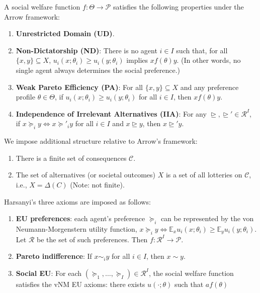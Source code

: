 \documentclass[11pt]{elegantbook_2}
\begin{document}
\begin{definition}
    A social welfare function $f: \Theta \rightarrow \mathcal{P}$ satisfies the following properties under the Arrow framework:
    \begin{enumerate}[$\circ$]
        \item \textbf{Unrestricted Domain (UD)}.
        \item \textbf{Non-Dictatorship (ND)}: There is no agent $i \in I$ such that, for all $\{x, y\} \subseteq X$, $u_i(x;\theta_i)\geq u_i(y;\theta_i)$ implies $x f(\theta) y$. (In other words, no single agent always determines the social preference.)
        \item \textbf{Weak Pareto Efficiency (PA)}: For all $\{x, y\} \subseteq X$ and any preference profile $\theta \in \Theta$, if $u_i(x;\theta_i)\geq u_i(y;\theta_i)$ for all $i \in I$, then $x f(\theta) y$.
        \item \textbf{Independence of Irrelevant Alternatives (IIA)}: For any $\trianglerighteq, \trianglerighteq' \in \mathcal{R}^I$, if $x \succcurlyeq_i y \Leftrightarrow x \succcurlyeq'_i y$ for all $i \in I$ and $x \trianglerighteq y$, then $x \trianglerighteq' y$.
    \end{enumerate}
\end{definition}
We impose additional structure relative to Arrow's framework:
\begin{enumerate}
    \item There is a finite set of consequences $\mathcal{C}$.
    \item The set of alternatives (or societal outcomes) $X$ is a set of all lotteries on $\mathcal{C}$, i.e., $X=\Delta(C)$ (Note: not finite).
\end{enumerate}

\begin{definition}
    Harsanyi's three axioms are imposed as follows:
    \begin{enumerate}
        \item \textbf{EU preferences}: each agent's preference $\succcurlyeq_i$ can be represented by the von Neumann-Morgenstern utility function, $x\succcurlyeq_i y\Leftrightarrow\mathbb{E}_xu_i(x;\theta_i)\geq \mathbb{E}_yu_i(y;\theta_i)$. Let $\mathcal{R}$ be the set of such preferences. Then $f: \mathcal{R}^I \rightarrow \mathcal{P}$.
        \item \textbf{Pareto indifference}: If $x\sim_i y$ for all $i\in I$, then $x\sim y$.
        \item \textbf{Social EU}: For each $(\succcurlyeq_1,\ldots,\succcurlyeq_I)\in \mathcal{R}^I$, the social welfare function satisfies the vNM EU axioms: there exists $u(\cdot;\theta)$ such that $a f(\theta)$
    \end{enumerate}
\end{definition}
\end{document}
